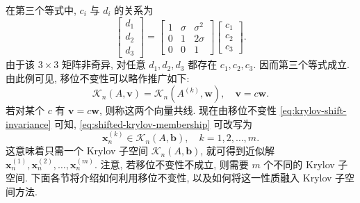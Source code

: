 {在第三个等式中, $c_i$ 与 $d_i$ 的关系为}
\[\begin{bmatrix}d_1\\d_2\\d_3\end{bmatrix}=\begin{bmatrix}1&\sigma&\sigma^2\\0&1&2\sigma\\0&0&1\end{bmatrix}\begin{bmatrix}c_1\\c_2\\c_3\end{bmatrix}.\]
{\leavevmode{}\label{idx:chapter-04-section-01:collinear-shift-invariance}由于该 $3\times3$ 矩阵非奇异, 对任意 $d_1,d_2,d_3$ 都存在 $c_1,c_2,c_3$. 因而第三个等式成立. 由此例可见, 移位不变性可以略作推广如下:}
\[\mathcal K_n(A,\bm v)=\mathcal K_n(A^{(k)},\bm w),\quad\bm v=c\bm w.\]
{若对某个 $c$ 有 $\bm v=c\bm w$, 则称这两个向量共线.}
{现在由移位不变性 \eqref{eq:krylov-shift-invariance} 可知, \eqref{eq:shifted-krylov-membership} 可改写为}
\[\bm x_n^{(k)}\in\mathcal K_n(A,\bm b),\quad k=1,2,\ldots,m.\]
{这意味着只需一个 Krylov 子空间 $\mathcal K_n(A,\bm b)$, 就可得到近似解 $\bm x_n^{(1)},\bm x_n^{(2)},\ldots,\bm x_n^{(m)}$. 注意, 若移位不变性不成立, 则需要 $m$ 个不同的 Krylov 子空间. 下面各节将介绍如何利用移位不变性, 以及如何将这一性质融入 Krylov 子空间方法.}
